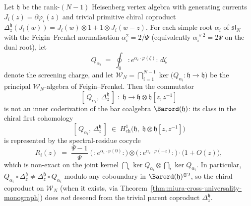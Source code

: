 \begin{proposition}
\label{prop:ff-screening-coproduct-obstruction}
\ClaimStatusConditional
Let $\mathfrak{h}$ be the rank-$(N-1)$ Heisenberg vertex algebra
with generating currents $J_i(z) = \partial\varphi_i(z)$ and trivial
primitive chiral coproduct
$\Delta_z^{\mathfrak{h}}(J_i(w)) = J_i(w)\otimes 1 + 1\otimes J_i(w-z)$.
For each simple root $\alpha_i$ of $\mathfrak{sl}_N$ with the
Feigin--Frenkel normalisation $\alpha_i^2 = 2/\Psi$
\textup{(}equivalently $\alpha_i^{\!\vee 2} = 2\Psi$ on the dual
root\textup{)}, let
\[
 Q_{\alpha_i}
 \;=\; \oint_0 \,:\!e^{\alpha_i\cdot\varphi(\zeta)}\!:\,d\zeta
\]
denote the screening charge, and let $\mathcal{W}_N
= \bigcap_{i=1}^{N-1}\ker\!\bigl(Q_{\alpha_i}\colon \mathfrak{h}
\to \mathfrak{h}\bigr)$ be the principal $\mathcal{W}_N$-algebra
of Feigin--Frenkel. Then the commutator
\[
 [\,Q_{\alpha_i},\,\Delta_z^{\mathfrak{h}}\,]
 \;\colon\; \mathfrak{h} \longrightarrow \mathfrak{h}\otimes \mathfrak{h}[z,z^{-1}]
\]
is not an inner coderivation of the bar coalgebra
$\Barord(\mathfrak{h})$: its class in the chiral first
cohomology
\[
 [\,Q_{\alpha_i},\,\Delta_z^{\mathfrak{h}}\,]
 \;\in\; H^1_{\mathrm{ch}}\bigl(\mathfrak{h},\;
 \mathfrak{h}\otimes \mathfrak{h}[z,z^{-1}]\bigr)
\]
is represented by the spectral-residue cocycle
\begin{equation}\label{eq:ff-screening-obstruction-cocycle}
 R_i(z)
 \;=\; \frac{\Psi - 1}{\Psi}\;
 \bigl(\,:\!e^{\alpha_i\cdot\varphi(0)}\!:\bigr)
 \otimes
 \bigl(\,:\!e^{\alpha_i\cdot\varphi(-z)}\!:\bigr)
 \cdot
 \bigl(1 + O(z)\bigr),
\end{equation}
which is non-exact on the joint kernel
$\bigcap_{i}\ker Q_{\alpha_i}\otimes \bigcap_{i}\ker Q_{\alpha_i}$.
In particular, $Q_{\alpha_i}\circ \Delta_z^{\mathfrak{h}}
\neq \Delta_z^{\mathfrak{h}}\circ Q_{\alpha_i}$ modulo any
coboundary in $\Barord(\mathfrak{h})^{\otimes 2}$, so the
chiral coproduct on $\mathcal{W}_N$ \textup{(}when it exists,
via Theorem~\ref{thm:miura-cross-universality-monograph}\textup{)} does
\emph{not} descend from the trivial parent coproduct
$\Delta_z^{\mathfrak{h}}$.
\end{proposition}

